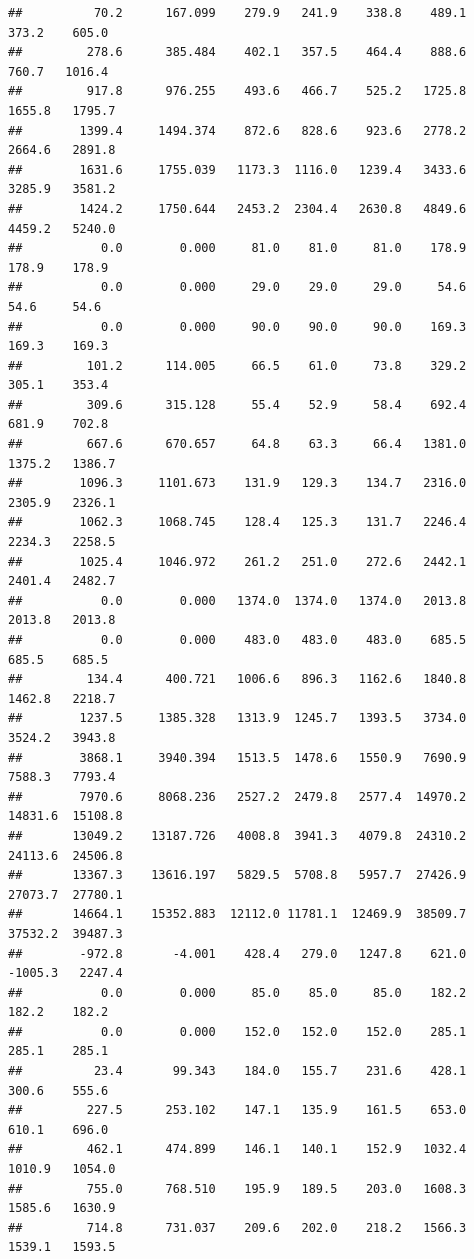 \documentclass[
]{article}
\begin{document}
\begin{verbatim}
##          70.2      167.099    279.9   241.9    338.8    489.1    373.2    605.0
##         278.6      385.484    402.1   357.5    464.4    888.6    760.7   1016.4
##         917.8      976.255    493.6   466.7    525.2   1725.8   1655.8   1795.7
##        1399.4     1494.374    872.6   828.6    923.6   2778.2   2664.6   2891.8
##        1631.6     1755.039   1173.3  1116.0   1239.4   3433.6   3285.9   3581.2
##        1424.2     1750.644   2453.2  2304.4   2630.8   4849.6   4459.2   5240.0
##           0.0        0.000     81.0    81.0     81.0    178.9    178.9    178.9
##           0.0        0.000     29.0    29.0     29.0     54.6     54.6     54.6
##           0.0        0.000     90.0    90.0     90.0    169.3    169.3    169.3
##         101.2      114.005     66.5    61.0     73.8    329.2    305.1    353.4
##         309.6      315.128     55.4    52.9     58.4    692.4    681.9    702.8
##         667.6      670.657     64.8    63.3     66.4   1381.0   1375.2   1386.7
##        1096.3     1101.673    131.9   129.3    134.7   2316.0   2305.9   2326.1
##        1062.3     1068.745    128.4   125.3    131.7   2246.4   2234.3   2258.5
##        1025.4     1046.972    261.2   251.0    272.6   2442.1   2401.4   2482.7
##           0.0        0.000   1374.0  1374.0   1374.0   2013.8   2013.8   2013.8
##           0.0        0.000    483.0   483.0    483.0    685.5    685.5    685.5
##         134.4      400.721   1006.6   896.3   1162.6   1840.8   1462.8   2218.7
##        1237.5     1385.328   1313.9  1245.7   1393.5   3734.0   3524.2   3943.8
##        3868.1     3940.394   1513.5  1478.6   1550.9   7690.9   7588.3   7793.4
##        7970.6     8068.236   2527.2  2479.8   2577.4  14970.2  14831.6  15108.8
##       13049.2    13187.726   4008.8  3941.3   4079.8  24310.2  24113.6  24506.8
##       13367.3    13616.197   5829.5  5708.8   5957.7  27426.9  27073.7  27780.1
##       14664.1    15352.883  12112.0 11781.1  12469.9  38509.7  37532.2  39487.3
##        -972.8       -4.001    428.4   279.0   1247.8    621.0  -1005.3   2247.4
##           0.0        0.000     85.0    85.0     85.0    182.2    182.2    182.2
##           0.0        0.000    152.0   152.0    152.0    285.1    285.1    285.1
##          23.4       99.343    184.0   155.7    231.6    428.1    300.6    555.6
##         227.5      253.102    147.1   135.9    161.5    653.0    610.1    696.0
##         462.1      474.899    146.1   140.1    152.9   1032.4   1010.9   1054.0
##         755.0      768.510    195.9   189.5    203.0   1608.3   1585.6   1630.9
##         714.8      731.037    209.6   202.0    218.2   1566.3   1539.1   1593.5

\end{verbatim}
\end{document}
